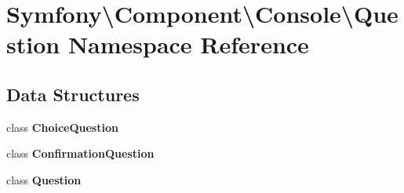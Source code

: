\section{Symfony\textbackslash{}Component\textbackslash{}Console\textbackslash{}Question Namespace Reference}
\label{namespace_symfony_1_1_component_1_1_console_1_1_question}
\subsection*{Data Structures}
\begin{DoxyCompactItemize}
\item 
class {\bf Choice\+Question}
\item 
class {\bf Confirmation\+Question}
\item 
class {\bf Question}
\end{DoxyCompactItemize}
